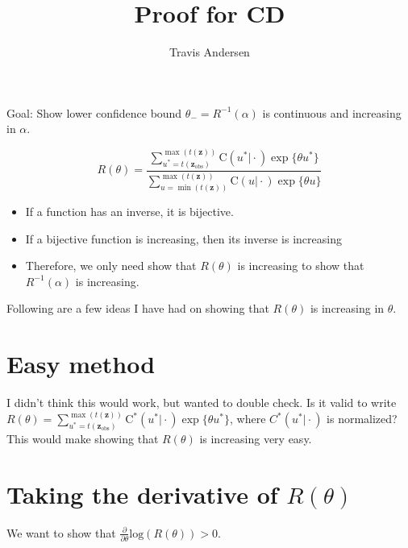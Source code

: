 \documentclass{article}
\title{Proof for CD}
\author{Travis Andersen}
\begin{document}
\maketitle  

Goal: Show lower confidence bound $\theta_- = R^{-1}(\alpha)$ is continuous and increasing in $\alpha$. 

\begin{equation} \label{eq:permCI}
  R(\theta) = \frac
  {\sum_{u^* = t(\mathbf{z}_{\text{obs}})}^{\max(t(\mathbf{z}))} \text{C}(u^* \vert \cdot) \exp\{\theta u^*\}}
  {\sum_{u = \min(t(\mathbf{z}))}^{\max(t(\mathbf{z}))} \text{C}(u \vert \cdot) \exp\{\theta u\}}
\end{equation}

\begin{itemize}
  \item If a function has an inverse, it is bijective.
  \item If a bijective function is increasing, then its inverse is increasing
  \item Therefore, we only need show that $R(\theta)$ is increasing to show that $R^{-1}(\alpha)$ is increasing. 
\end{itemize}

Following are a few ideas I have had on showing that $R(\theta)$ is increasing in $\theta$. 

\section{Easy method}

I didn't think this would work, but wanted to double check. Is it valid to write $R(\theta) = \sum_{u^* = t(\mathbf{z}_{\text{obs}})}^{\max(t(\mathbf{z}))} \text{C}^*(u^* \vert \cdot) \exp\{\theta u^*\}$, where $C^*(u^* \vert \cdot)$ is normalized? This would make showing that $R(\theta)$ is increasing very easy.

\section{Taking the derivative of $R(\theta)$}

We want to show that $\frac{\partial}{\partial \theta} \text{log}(R(\theta)) > 0$.
\end{document}
